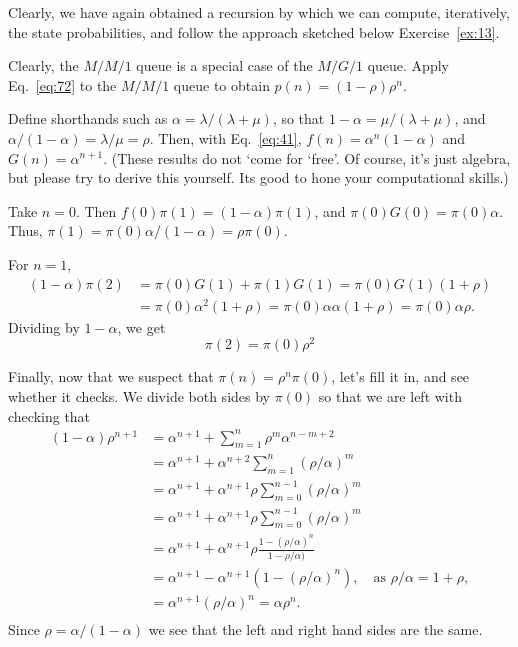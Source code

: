 Clearly, we have  again obtained a recursion by which we can compute, iteratively, the
state probabilities, and follow the approach sketched below Exercise~\ref{ex:13}. 



\begin{exercise}
  Clearly, the $M/M/1$ queue is a special case of the $M/G/1$
  queue. Apply Eq.~\eqref{eq:72} to the $M/M/1$ queue to obtain $p(n)=(1-\rho)\rho^n$. 
  \begin{hint}
 Define shorthands
    such as $\alpha=\lambda/(\lambda+\mu)$, so that
    $1-\alpha = \mu/(\lambda+\mu)$, and
    $\alpha/(1-\alpha) = \lambda /\mu = \rho$.  Then, with Eq.~\ref{eq:41}, $f(n) = \alpha^n(1-\alpha)$ and $G(n) = \alpha^{n+1}$.  (These results do not `come for
    `free'. Of course, it's just algebra, but please try to derive this
    yourself. Its good to hone your computational skills.)
  \end{hint}
    \begin{solution}
      Take $n=0$. Then $f(0) \pi(1) = (1-\alpha)\pi(1)$, and
      $\pi(0)G(0) = \pi(0)\alpha$. Thus,
      $\pi(1) = \pi(0)\alpha/(1-\alpha) = \rho \pi(0)$. 

For $n=1$,
\begin{equation*}
  \begin{split}
  (1-\alpha)  \pi(2) 
&= \pi(0)G(1) + \pi(1)G(1) = \pi(0)G(1)(1+\rho) \\
&= \pi(0)\alpha^2(1+\rho) = \pi(0)\alpha \alpha (1+\rho) = \pi(0)\alpha \rho.
  \end{split}
\end{equation*}
Dividing by $1-\alpha$, we get
\begin{equation*}
  \pi(2) = \pi(0)\rho^2
\end{equation*}

Finally, now that we suspect that $\pi(n) = \rho^n \pi(0)$, let's fill
it in, and see whether it checks. We divide both sides by $\pi(0)$ so
that we are left with checking that
\begin{equation*}
  \begin{split}
    (1-\alpha)\rho^{n+1} 
&= \alpha^{n+1} + \sum_{m=1}^n \rho^m \alpha^{n-m+2}  \\
&= \alpha^{n+1} + \alpha^{n+2}\sum_{m=1}^n (\rho/\alpha)^m  \\
&= \alpha^{n+1} + \alpha^{n+1}\rho \sum_{m=0}^{n-1} (\rho/\alpha)^m \\
&= \alpha^{n+1} + \alpha^{n+1}\rho \sum_{m=0}^{n-1} (\rho/\alpha)^m\\
&= \alpha^{n+1} + \alpha^{n+1}\rho \frac{1-(\rho/\alpha)^n}{1-\rho/\alpha)}\\
&= \alpha^{n+1} - \alpha^{n+1}(1-(\rho/\alpha)^n), \quad\text{as } \rho/\alpha = 1+\rho,\\
&= \alpha^{n+1}(\rho/\alpha)^n = \alpha \rho^n.\\
  \end{split}
\end{equation*}
Since $\rho=\alpha/(1-\alpha)$ we see that the left and right hand sides are the same. 


\end{solution}
\end{exercise}
